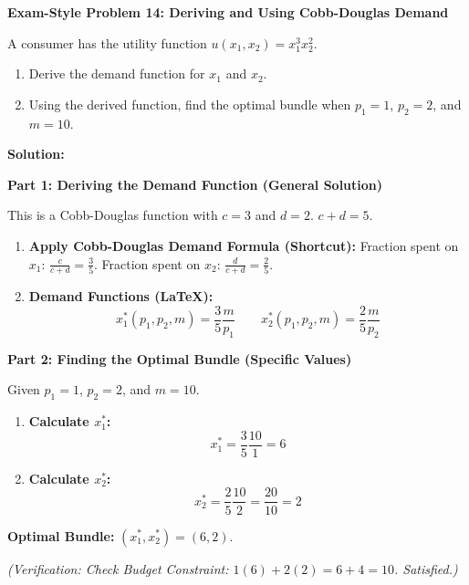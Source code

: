 \documentclass{article}
\begin{document}
\vspace{0.5em}
\hrulefill
\vspace{0.5em}

\noindent\textbf{Exam-Style Problem 14: Deriving and Using Cobb-Douglas Demand}
\vspace{0.5em}

\noindent A consumer has the utility function $u(x_1, x_2) = x_1^3 x_2^2$.
\begin{enumerate}
    \item Derive the demand function for $x_1$ and $x_2$.
    \item Using the derived function, find the optimal bundle when $p_1=1$, $p_2=2$, and $m=10$.
\end{enumerate}

\vspace{1em}
\noindent\textbf{Solution:}
\vspace{0.5em}

\noindent\textbf{Part 1: Deriving the Demand Function (General Solution)}
\vspace{0.5em}

\noindent This is a Cobb-Douglas function with $c=3$ and $d=2$. $c+d = 5$.
\begin{enumerate}
    \item \textbf{Apply Cobb-Douglas Demand Formula (Shortcut):} Fraction spent on $x_1$: $\frac{c}{c+d} = \frac{3}{5}$. Fraction spent on $x_2$: $\frac{d}{c+d} = \frac{2}{5}$.
    \item \textbf{Demand Functions (LaTeX):} \[ x_1^*(p_1, p_2, m) = \frac{3}{5} \frac{m}{p_1} \qquad x_2^*(p_1, p_2, m) = \frac{2}{5} \frac{m}{p_2} \]
\end{enumerate}

\vspace{0.5em}
\noindent\textbf{Part 2: Finding the Optimal Bundle (Specific Values)}
\vspace{0.5em}

\noindent Given $p_1=1$, $p_2=2$, and $m=10$.
\begin{enumerate}
    \item \textbf{Calculate $x_1^*$:} \[ x_1^* = \frac{3}{5} \frac{10}{1} = 6 \]
    \item \textbf{Calculate $x_2^*$:} \[ x_2^* = \frac{2}{5} \frac{10}{2} = \frac{20}{10} = 2 \]
\end{enumerate}

\noindent\textbf{Optimal Bundle:} $(x_1^*, x_2^*) = (6, 2)$.

\vspace{0.5em}
\noindent\textit{(Verification: Check Budget Constraint: $1(6) + 2(2) = 6 + 4 = 10$. Satisfied.)}
\end{document}
